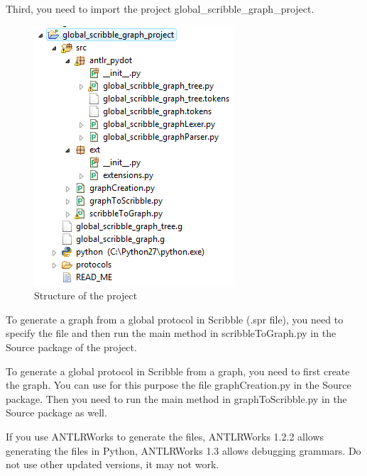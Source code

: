 \documentclass[a4paper,11pt,twoside]{report}
\begin{document}
Third, you need to import the project global\_scribble\_graph\_project.

\begin{figure}[h]
\begin{center}
\includegraphics{project2}
\caption{Structure of the project}
\end{center}
\end{figure}

To generate a graph from a global protocol in Scribble (.spr file), you need to specify the file and then run the main method in scribbleToGraph.py in the Source package of the project.

To generate a global protocol in Scribble from a graph, you need to first create the graph. You can use for this purpose the file graphCreation.py in the Source package. Then you need to run the main method in graphToScribble.py in the Source package as well.

If you use ANTLRWorks to generate the files, ANTLRWorks 1.2.2 allows generating the files in Python, ANTLRWorks 1.3 allows debugging grammars. Do not use other updated versions, it may not work.
\end{document}

